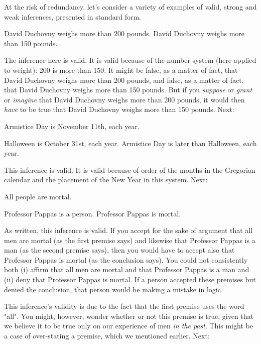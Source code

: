 At the risk of redundancy, let's consider a variety of examples of valid, strong and weak inferences, presented in standard form.

\begin{earg*}
\item  David Duchovny weighs more than 200 pounds.
\itemc  David Duchovny weighs more than 150 pounds.
\end{earg*}

The inference here is valid. It is valid because of the number system (here applied to weight): 200 is more than 150. It might be false, as a matter of fact, that David Duchovny weighs more than 200 pounds, and false, as a matter of fact, that David Duchovny weighs more than 150 pounds. But if you \textit{suppose }or \textit{grant }or \textit{imagine }that David Duchovny weighs more than 200 pounds, it would then \textit{have }to be true that David Duchovny weighs more than 150 pounds. Next:

\begin{earg*}
\item  Armistice Day is November 11th, each year.
\item  Halloween is October 31st, each year.
\itemc  Armistice Day is later than Halloween, each year.
\end{earg*}

This inference is valid. It is valid because of order of the months in the Gregorian calendar and the placement of the New Year in this system. Next:

\begin{earg*}
\item  All people are mortal.
\item  Professor Pappas is a person.
\itemc  Professor Pappas is mortal.
\end{earg*}

As written, this inference is valid. If you accept for the sake of argument that all men are mortal (as the first premise says) and likewise that Professor Pappas is a man (as the second premise says), then you would have to accept also that Professor Pappas is mortal (as the conclusion says). You could not consistently both (i) affirm that all men are mortal and that Professor Pappas is a man and (ii) deny that Professor Pappas is mortal. If a person accepted these premises but denied the conclusion, that person would be making a mistake in logic.

This inference's validity is due to the fact that the first premise uses the word "all". You might, however, wonder whether or not this premise is true, given that we believe it to be true only on our experience of men \textit{in the past}. This might be a case of over-stating a premise, which we mentioned earlier. Next:

